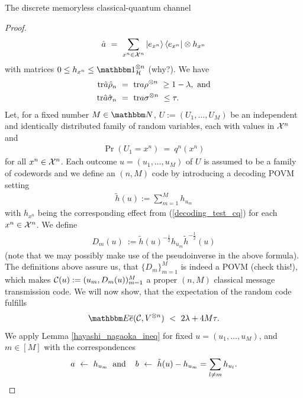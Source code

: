 \begin{section}{The discrete memoryless  classical-quantum channel}
\begin{proof}
\begin{align}
       \hat{a} \ = \ \sum_{x^n \in {\mathcal X}^n} \ket{e_{x^n}}\bra{e_{x^n}} \otimes h_{x^n} \label{decoding_test_cq}
      \end{align}
      with matrices $0 \leq h_{x^n} \leq \bbmeins_{\cH}^{\otimes n}$ (why?). We have
      \begin{align*}
      \tr \hat{a} \hat{\rho}_n \ &= \ \tr a \rho^{\otimes n} \ \geq 1 - \lambda, \ \text{and} \\
      \tr \hat{a} \hat{\sigma}_n \ &= \ \tr a \sigma^{\otimes n} \ \leq \tau. 
      \end{align*}
	  Let, for a fixed number $M \in \bbmN$, $U := (U_1,\dots,U_M)$ be an independent and identically distributed family of random variables, each with values in ${\mathcal X}^n$ and 
	  \begin{align*}
		  \Pr\left(U_1 = x^n\right) \ = \ q^n(x^n)		
	  \end{align*}
      for all $x^n \in {\mathcal X}^n$. Each outcome $u = (u_1,\dots,u_M)$ of $U$ is assumed to be a 
      family of codewords and we define an $(n,M)$ code by introducing a decoding POVM       setting 
      \begin{align*}
       \tilde{h}(u) := \sum_{m=1}^M h_{u_m}
      \end{align*}
      with $h_{x^n}$ being the corresponding effect from (\ref{decoding_test_cq}) for each $x^n \in {\mathcal X}^n$. We define  
      \begin{align*}
       D_{m}(u) \ := \tilde{h}(u)^{-\frac{1}{2}}h_{u_m}\tilde{h}^{-\frac{1}{2}}(u)
      \end{align*}
      (note that we may possibly make use of the pseudoinverse in the above formula). 
      The definitions above assure us, that $\{D_m\}_{m=1}^M$ is indeed a POVM (check this!), which makes ${\mathcal C}(u) :=  (u_m, D_m(u))_{m=1}^M$ a proper $(n,M)$ classical message transmission code. We will now show, that the expectation of the random code fulfills 
      \begin{align}
      \bbmE\overline{e}(\cC, V^{\otimes n}) \ < \ 2 \lambda + 4M\tau. \label{hayashi-nagaoka-absch}
      \end{align}
      We apply Lemma \ref{hayashi_nagaoka_ineq} for fixed $u = (u_1,\dots, u_M)$, and $m \in [M]$ with the correspondences
	  \begin{align*} 
	   a \ \leftarrow \ h_{u_m} \hspace{.2cm} \text{and} \hspace{.4cm} b \ \leftarrow \ \tilde{h}(u) - h_{u_m} = \sum_{l \neq m} h_{u_l}.
	  \end{align*}

\end{proof}
\end{section}
